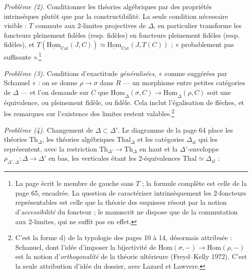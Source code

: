 \documentclass[11pt,a4paper]{article}
\begin{document}
\emph{Problème (2).} Conditionner les théories algébriques par des
propriétés intrinsèques plutôt que par la constructibilité. La seule
condition nécessaire visible : $T$ commute aux 2-limites projectives de
$\Delta$, en particulier transforme les foncteurs pleinement fidèles
(resp. fidèles) en foncteurs pleinement fidèles (resp. fidèles), et
$T(\underline{\mathrm{Hom}}_{\mathrm{Cat}}(J, C)) \simeq \underline{\mathrm{Hom}}_{
\mathrm{Cat}}(J, T(C))$ ; « probablement pas suffisante ».\footnote{La page
écrit le membre de gauche sans $T$ ; la formule complète est celle de la
page 65, encadrée. La question de caractériser intrinsèquement les
2-foncteurs représentables est celle que la théorie des esquisses résout
par la notion d'\emph{accessibilité} du foncteur ; le manuscrit ne dispose
que de la commutation aux 2-limites, qui ne suffit pas en effet.}

\emph{Problème (3).} Conditions d'exactitude \emph{généralisées}, « comme
suggérées par Schanuel » : on se donne $\rho \to \sigma$ dans $R$ — un
morphisme entre petites catégories de $\Delta$ — et l'on demande sur $C$
que $\underline{\mathrm{Hom}}_{\Delta}(\sigma, C) \to \underline{\mathrm{Hom}}
_{\Delta}(\rho, C)$ soit une équivalence, ou pleinement fidèle, ou fidèle.
Cela inclut l'égalisation de flèches, et les remarques sur l'existence
des limites restent valables.\footnote{C'est la forme d) de la typologie
des pages 10 à 14, désormais attribuée : Schanuel, dont l'idée d'imposer
la bijectivité de $\mathrm{Hom}(\sigma, -) \to \mathrm{Hom}(\rho, -)$ est
la notion d'\emph{orthogonalité} de la théorie ultérieure (Freyd--Kelly
1972). C'est la seule attribution d'idée du dossier, avec Lazard et
Lawvere.}

\emph{Problème (4).} Changement de $\Delta \subset \Delta'$. Le diagramme de
la page 64 place les théories $\mathrm{Th}_{\Delta}$, les théories
algébriques $\mathrm{Thal}_{\Delta}$ et les catégories $\Delta_{\mathrm{al}}$
qui les représentent, avec la restriction $\mathrm{Th}_{\Delta'} \to
\mathrm{Th}_{\Delta}$ en haut et la $\Delta'$-enveloppe $\rho_{\Delta',
\Delta} : \Delta \to \Delta'$ en bas, les verticales étant les
2-équivalences $\mathrm{Thal} \simeq \Delta_{\mathrm{al}}$ :

\end{document}
